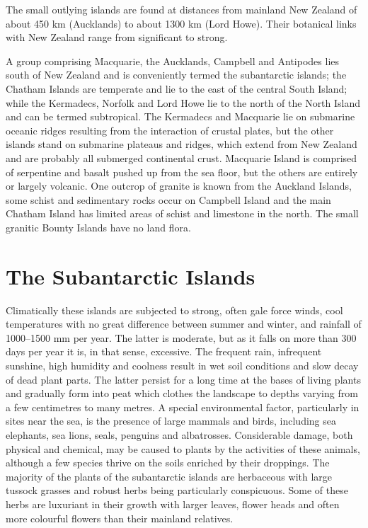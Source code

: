 The small outlying islands are found at distances from mainland New Zealand of about 450 km (Aucklands) to about 1300 km (Lord Howe).
Their botanical links with New Zealand range from significant to strong.

A group comprising Macquarie, the Aucklands, Campbell and Antipodes lies south of New Zealand and is conveniently termed the subantarctic islands; the Chatham Islands are temperate and lie to the east of the central South Island; while the Kermadecs, Norfolk and Lord Howe lie to the north of the North Island and can be termed subtropical.
The Kermadecs and Macquarie lie on submarine oceanic ridges resulting from the interaction of crustal plates, but the other islands stand on submarine plateaus and ridges, which extend from New Zealand and are probably all submerged continental crust.
Macquarie Island is comprised of serpentine and basalt pushed up from the sea floor, but the others are entirely or largely volcanic.
One outcrop of granite is known from the Auckland Islands, some schist and sedimentary rocks occur on Campbell Island and the main Chatham Island has limited areas of schist and limestone in the north.
The small granitic Bounty Islands have no land flora.

\section{The Subantarctic Islands}

Climatically these islands are subjected to strong, often gale force winds, cool temperatures with no great difference between summer and winter, and rainfall of 1000--1500 mm per year.
The latter is moderate, but as it falls on more than 300 days per year it is, in that sense, excessive.
The frequent rain, infrequent sunshine, high humidity and coolness result in wet soil conditions and slow decay of dead plant parts.
The latter persist for a long time at the bases of living plants and gradually form into peat which clothes the landscape to depths varying from a few centimetres to many metres.
A special environmental factor, particularly in sites near the sea, is the presence of large mammals and  birds, including sea elephants, sea lions, seals, penguins and albatrosses.
Considerable damage, both physical and chemical, may be caused to plants by the activities of these animals, although a few species thrive on the soils enriched by their droppings.
The majority of the plants of the subantarctic islands are herbaceous with large tussock grasses and robust herbs being particularly conspicuous.
Some of these herbs are luxuriant in their growth with larger leaves, flower heads and often more colourful flowers than their mainland relatives.


